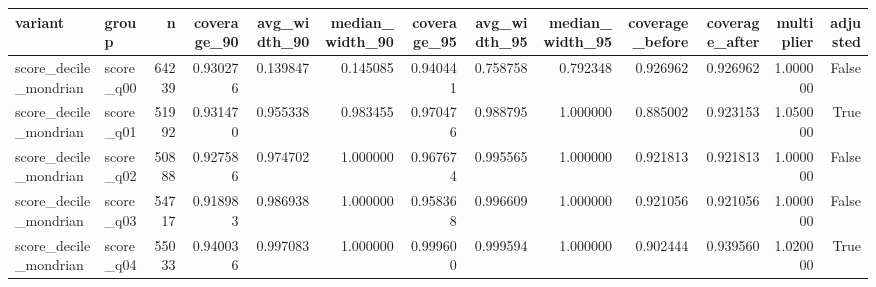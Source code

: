 \begin{tabular}{llrrrrrrrrrrr}
\toprule
variant & group & n & coverage\_90 & avg\_width\_90 & median\_width\_90 & coverage\_95 & avg\_width\_95 & median\_width\_95 & coverage\_before & coverage\_after & multiplier & adjusted \\
\midrule
score\_decile\_mondrian & score\_q00 & 64239 & 0.930276 & 0.139847 & 0.145085 & 0.940441 & 0.758758 & 0.792348 & 0.926962 & 0.926962 & 1.000000 & False \\
score\_decile\_mondrian & score\_q01 & 51992 & 0.931470 & 0.955338 & 0.983455 & 0.970476 & 0.988795 & 1.000000 & 0.885002 & 0.923153 & 1.050000 & True \\
score\_decile\_mondrian & score\_q02 & 50888 & 0.927586 & 0.974702 & 1.000000 & 0.967674 & 0.995565 & 1.000000 & 0.921813 & 0.921813 & 1.000000 & False \\
score\_decile\_mondrian & score\_q03 & 54717 & 0.918983 & 0.986938 & 1.000000 & 0.958368 & 0.996609 & 1.000000 & 0.921056 & 0.921056 & 1.000000 & False \\
score\_decile\_mondrian & score\_q04 & 55033 & 0.940036 & 0.997083 & 1.000000 & 0.999600 & 0.999594 & 1.000000 & 0.902444 & 0.939560 & 1.020000 & True \\
\bottomrule
\end{tabular}
